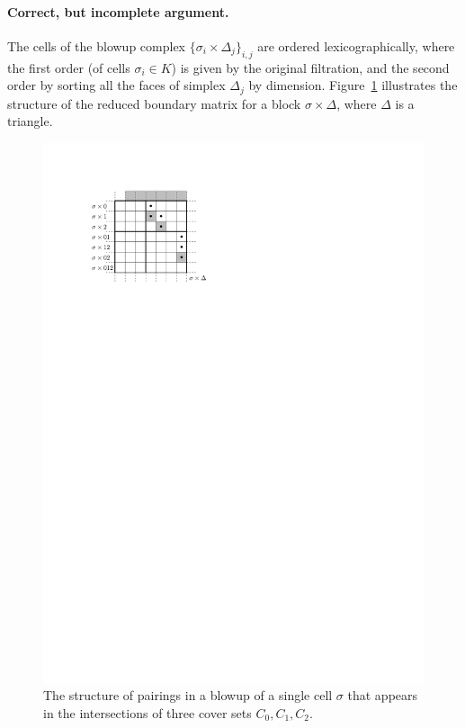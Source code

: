 \documentclass{article}
\newcommand{\ssx}   {\sigma}
\begin{document}
\paragraph{Correct, but incomplete argument.}

The cells of the blowup complex $\{ \ssx_i \times \Delta_j \}_{i,j}$ are ordered
lexicographically, where the first order (of cells $\ssx_i \in K$) is given by
the original filtration, and the second order by sorting all the faces of
simplex $\Delta_j$ by dimension.
Figure~\ref{fig:blowup-cell} illustrates the structure of the reduced boundary
matrix for a block $\ssx \times \Delta$, where $\Delta$ is a triangle.

\begin{figure}
    \centering
    \includegraphics{figs/blowup-cell}
    \caption{The structure of pairings in a blowup of a single cell $\ssx$ that
             appears in the intersections of three cover sets $C_0, C_1, C_2$.}
    \label{fig:blowup-cell}
\end{figure}
\end{document}
